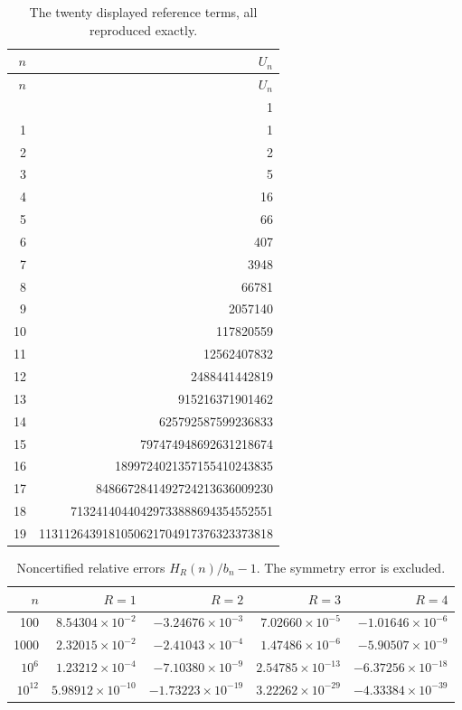 \documentclass[11pt]{article}
\theoremstyle{remark}\newtheorem{remark}[theorem]{Remark}
\begin{document}
\begin{longtable}{r r}
\caption{The twenty displayed reference terms, all reproduced exactly.}\label{mis:tab:exact}\\
\toprule $n$ & $U_n$ \\ \midrule
\endfirsthead
\toprule $n$ & $U_n$ \\ \midrule
\endhead
\bottomrule\endfoot
0 & 1 \\
1 & 1 \\
2 & 2 \\
3 & 5 \\
4 & 16 \\
5 & 66 \\
6 & 407 \\
7 & 3948 \\
8 & 66781 \\
9 & 2057140 \\
10 & 117820559 \\
11 & 12562407832 \\
12 & 2488441442819 \\
13 & 915216371901462 \\
14 & 625792587599236833 \\
15 & 797474948692631218674 \\
16 & 1899724021357155410243835 \\
17 & 8486672841492724213636009230 \\
18 & 71324140440429733888694354552551 \\
19 & 1131126439181050621704917376323373818 \\
\end{longtable}
\begin{table}[htbp]\centering\small
\caption{Noncertified relative errors $H_R(n)/b_n-1$. The symmetry error is excluded.}\label{mis:tab:orders}
\begin{tabular}{r r r r r}\toprule
$n$ & $R=1$ & $R=2$ & $R=3$ & $R=4$ \\ \midrule
100 & $8.54304\times10^{-2}$ & $-3.24676\times10^{-3}$ & $7.02660\times10^{-5}$ & $-1.01646\times10^{-6}$ \\
1000 & $2.32015\times10^{-2}$ & $-2.41043\times10^{-4}$ & $1.47486\times10^{-6}$ & $-5.90507\times10^{-9}$ \\
$10^6$ & $1.23212\times10^{-4}$ & $-7.10380\times10^{-9}$ & $2.54785\times10^{-13}$ & $-6.37256\times10^{-18}$ \\
$10^{12}$ & $5.98912\times10^{-10}$ & $-1.73223\times10^{-19}$ & $3.22262\times10^{-29}$ & $-4.33384\times10^{-39}$ \\
\bottomrule\end{tabular}\end{table}
\end{document}
